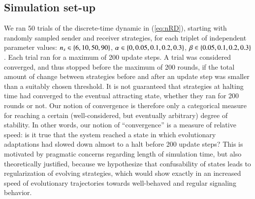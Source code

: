 \documentclass[fleqn,reqno,10pt]{article}
\newcommand{\imprecision}{\ensuremath{\alpha}} %
\newcommand{\toler}{\ensuremath{\beta}} %
\newcommand{\ns}{\ensuremath{n_s}} %
\begin{document}
\subsection{Simulation set-up}
\label{sec:simulations}

We ran 50 trials of the discrete-time dynamic in (\ref{eq:nRD}), starting with randomly sampled
sender and receiver strategies, for each triplet of independent parameter values:
$\ns \in \set{6, 10, 50, 90}$, $\imprecision \in \set{0, 0.05, 0.1, 0.2, 0.3}$,
$\toler \in \set{0.05, 0.1, 0.2, 0.3}$. Each trial ran for a maximum of 200 update steps. A
trial was considered converged, and thus stopped before the maximum of 200 rounds, if the total
amount of change between strategies before and after an update step was smaller than a suitably
chosen threshold. It is not guaranteed that strategies at halting time had converged to the
eventual attracting state, whether they ran for 200 rounds or not. Our notion of convergence is
therefore only a categorical measure for reaching a certain (well-considered, but eventually
arbitrary) degree of stability. In other words, our notion of ``convergence'' is a measure of
relative speed: is it true that the system reached a state in which evolutionary adaptations
had slowed down almost to a halt before 200 update steps? This is motivated by pragmatic
concerns regarding length of simulation time, but also theoretically justified, because we
hypothesize that confusability of states leads to regularization of evolving strategies, which
would show exactly in an increased speed of evolutionary trajectories towards well-behaved and
regular signaling behavior.
\end{document}
